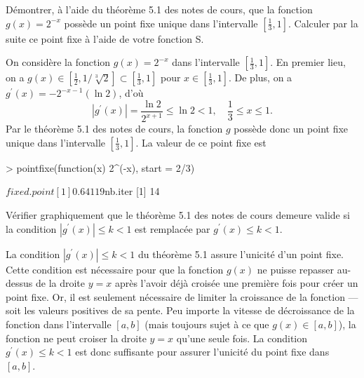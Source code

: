 \begin{exercice}
  Démontrer, à l'aide du théorème 5.1 des notes de cours, que la
  fonction $g(x) = 2^{-x}$ possède un point fixe unique dans
  l'intervalle $[\frac{1}{3}, 1]$. Calculer par la suite ce point fixe
  à l'aide de votre fonction S.
  \begin{sol}
    On considère la fonction $g(x) = 2^{-x}$ dans l'intervalle
    $[\frac{1}{3}, 1]$. En premier lieu, on a $g(x) \in [\frac{1}{2},
    1/\sqrt[3]{2}] \subset [\frac{1}{3}, 1]$ pour $x \in [\frac{1}{3},
    1]$. De plus, on a $g^\prime(x) = -2^{-x - 1} (\ln 2)$, d'où
    \begin{displaymath}
      |g^\prime(x)| = \frac{\ln 2}{2^{x + 1}} \leq \ln 2 < 1, \quad
      \frac{1}{3} \leq x \leq 1.
    \end{displaymath}
    Par le théorème 5.1 des notes de cours, la fonction $g$ possède
    donc un point fixe unique dans l'intervalle $[\frac{1}{3}, 1]$. La
    valeur de ce point fixe est
\begin{Schunk}
\begin{Sinput}
> pointfixe(function(x) 2^(-x), start = 2/3)
\end{Sinput}
\begin{Soutput}
$fixed.point
[1] 0.64119

$nb.iter
[1] 14
\end{Soutput}
\end{Schunk}
  \end{sol}
\end{exercice}

\begin{exercice}
  Vérifier graphiquement que le théorème 5.1 des notes de cours
  demeure valide si la condition $|g^\prime(x)| \leq k < 1$ est
  remplacée par $g^\prime(x) \leq k < 1$.
  \begin{sol}
    La condition $|g^\prime(x)| \leq k < 1$ du théorème 5.1 assure
    l'unicité d'un point fixe. Cette condition est nécessaire pour que
    la fonction $g(x)$ ne puisse repasser au-dessus de la droite $y =
    x$ après l'avoir déjà croisée une première fois pour créer un
    point fixe. Or, il est seulement nécessaire de limiter la
    croissance de la fonction --- soit les valeurs positives de sa
    pente. Peu importe la vitesse de décroissance de la fonction dans
    l'intervalle $[a, b]$ (mais toujours sujet à ce que $g(x) \in [a,
    b]$), la fonction ne peut croiser la droite $y = x$ qu'une seule
    fois. La condition $g^\prime(x) \leq k < 1$ est donc suffisante
    pour assurer l'unicité du point fixe dans $[a, b]$.
  \end{sol}
\end{exercice}


